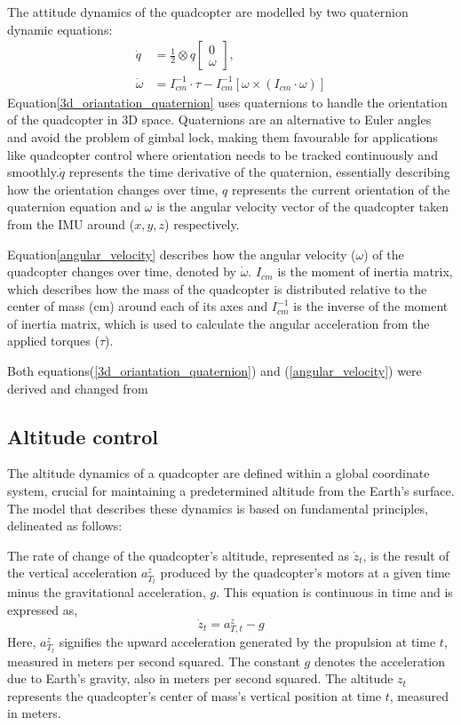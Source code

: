 \documentclass{report}
\begin{document}
The attitude dynamics of the quadcopter are modelled by two quaternion dynamic
equations:
\begin{align}
    \dot{q} &= \frac{1}{2} \otimes q\begin{bmatrix} 0 \\ \omega \end{bmatrix}, \label{3d_oriantation_quaternion}\\
    \dot{\omega} &= I_{cm}^{-1} \cdot \tau - I_{cm}^{-1} \left[ \omega \times (I_{cm} \cdot \omega) \right] \label{angular_velocity}
\end{align}
Equation\eqref{3d_oriantation_quaternion} uses quaternions to handle the orientation of the quadcopter in 3D space. Quaternions are an
alternative to Euler angles and avoid the problem of gimbal lock, making them
favourable for applications like quadcopter control where orientation needs to
be tracked continuously and smoothly.\(\dot{q}\) represents the time derivative
of the quaternion, essentially describing how the orientation changes over time,
\(q\) represents the current orientation of the quaternion equation and
\(\omega\) is the angular velocity vector of the quadcopter taken from the IMU
around (\(x, y, z\)) respectively.

Equation\eqref{angular_velocity} describes how the angular velocity (\(\omega\))
of the quadcopter changes over time, denoted by \(\dot \omega\). \(I_{cm}\) is
the moment of inertia matrix, which describes how the mass of the quadcopter is
distributed relative to the center of mass (cm) around each of its axes and
\(I_{cm}^{-1}\) is the  inverse of the moment of inertia matrix, which is used
to calculate the angular acceleration from the applied torques (\(\tau\)).

Both equations(\eqref{3d_oriantation_quaternion}) and (\eqref{angular_velocity}) were
derived and changed from \cite{QuaternionBasedAttitudeControl}

\subsection{Altitude control}\label{Altitude_control} The altitude dynamics
of a quadcopter are defined within a global coordinate system, crucial for
maintaining a predetermined altitude from the Earth's surface. The model that
describes these dynamics is based on fundamental principles, delineated as
follows:

The rate of change of the quadcopter's altitude, represented as \( \dot{z}_t \),
is the result of the vertical acceleration \( a^z_{T_t} \) produced by the
quadcopter's motors at a given time minus the gravitational acceleration, \( g
\). This equation is continuous in time and is expressed as,
\begin{equation}
\dot{z}_t = a^z_{T,t} - g
\end{equation}\label{vertical acceleration}
\noindent
Here, \( a^z_{T_t} \) signifies the upward acceleration generated by the
propulsion at time \( t \), measured in meters per second squared. The constant
\( g \) denotes the acceleration due to Earth's gravity, also in meters per
second squared. The altitude \( z_t \) represents the quadcopter's center of
mass's vertical position at time \( t \), measured in meters.
\end{document}
